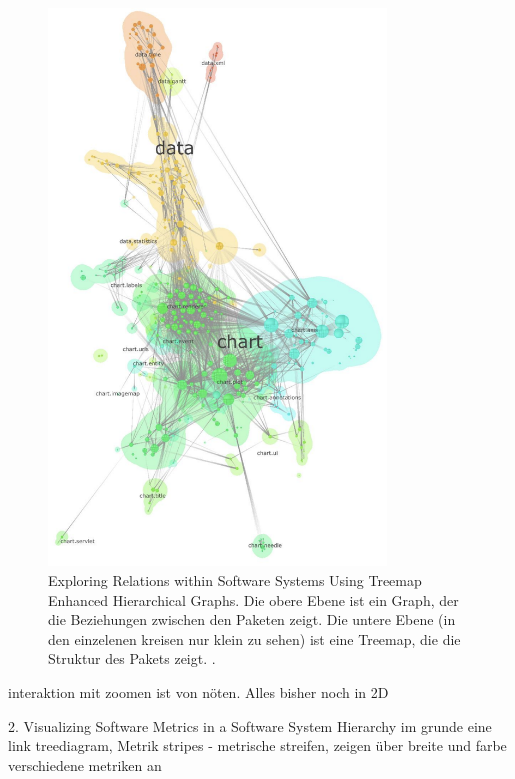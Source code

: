 \begin{figure}
    \centering
    \includegraphics[width=0.8\textwidth]{images/literatur/expoloringRelations.png}
    \caption{Exploring Relations within Software Systems Using Treemap Enhanced Hierarchical Graphs. Die obere Ebene ist ein Graph, der die Beziehungen zwischen den Paketen zeigt. Die untere Ebene (in den einzelenen kreisen nur klein zu sehen) ist eine Treemap, die die Struktur des Pakets zeigt. \cite[5]{exploringRelations}.}
    \label{fig:exploringRelations}
\end{figure}

interaktion mit zoomen ist von nöten. 
Alles bisher noch in 2D

2. Visualizing Software Metrics in a Software System Hierarchy \cite{visSoftwareMetricsBook}
im grunde eine link treediagram, 
Metrik stripes - metrische streifen, zeigen über breite und farbe verschiedene metriken an

